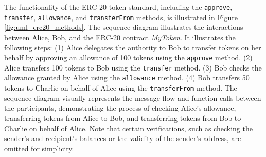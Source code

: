 The functionality of the ERC-20 token standard, including the \texttt{approve}, \texttt{transfer}, \texttt{allowance}, and \texttt{transferFrom} methods, is illustrated in Figure 
\ref{fig:uml_erc20_methods}. The sequence diagram illustrates the interactions between Alice, Bob, and the ERC-20 contract \textit{MyToken}.
It illustrates the following steps: (1) Alice delegates the authority to Bob to transfer tokens on her behalf by approving an allowance of 100 tokens using the \texttt{approve} method. 
(2) Alice transfers 100 tokens to Bob using the \texttt{transfer} method. (3) Bob checks the allowance granted by Alice using the \texttt{allowance} method. (4) Bob transfers 50 tokens 
to Charlie on behalf of Alice using the \texttt{transferFrom} method. 
The sequence diagram visually represents the message flow and function calls between the participants, demonstrating the process of checking Alice's allowance, transferring tokens from 
Alice to Bob, and transferring tokens from Bob to Charlie on behalf of Alice. Note that certain verifications, such as checking the sender's and recipient's balances or the 
validity of the sender's address, are omitted for simplicity.


